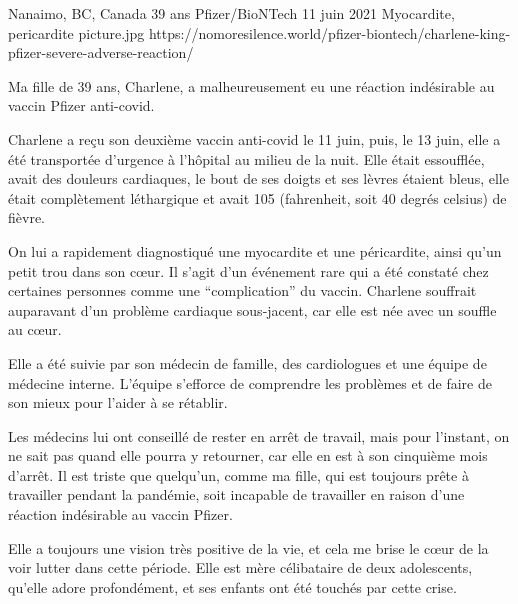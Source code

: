{Nanaimo, BC, Canada}
{39 ans}
{Pfizer/BioNTech}
{11 juin 2021}
{Myocardite, pericardite}
{picture.jpg}
{https://nomoresilence.world/pfizer-biontech/charlene-king-pfizer-severe-adverse-reaction/}
{

Ma fille de 39 ans, Charlene, a malheureusement eu une réaction indésirable au
vaccin Pfizer anti-covid.

Charlene a reçu son deuxième vaccin anti-covid le 11 juin, puis, le 13 juin,
elle a été transportée d'urgence à l'hôpital au milieu de la nuit. Elle était
essoufflée, avait des douleurs cardiaques, le bout de ses doigts et ses lèvres
étaient bleus, elle était complètement léthargique et avait 105 (fahrenheit,
soit 40 degrés celsius) de fièvre.

On lui a rapidement diagnostiqué une myocardite et une péricardite, ainsi qu'un
petit trou dans son cœur. Il s'agit d'un événement rare qui a été constaté chez
certaines personnes comme une “complication” du vaccin. Charlene souffrait
auparavant d'un problème cardiaque sous-jacent, car elle est née avec un souffle
au cœur.

Elle a été suivie par son médecin de famille, des cardiologues et une équipe de
médecine interne. L'équipe s'efforce de comprendre les problèmes et de faire de
son mieux pour l'aider à se rétablir.

Les médecins lui ont conseillé de rester en arrêt de travail, mais pour
l'instant, on ne sait pas quand elle pourra y retourner, car elle en est à son
cinquième mois d'arrêt. Il est triste que quelqu'un, comme ma fille, qui est
toujours prête à travailler pendant la pandémie, soit incapable de travailler en
raison d'une réaction indésirable au vaccin Pfizer.

Elle a toujours une vision très positive de la vie, et cela me brise le cœur de
la voir lutter dans cette période. Elle est mère célibataire de deux
adolescents, qu'elle adore profondément, et ses enfants ont été touchés par
cette crise.

}
